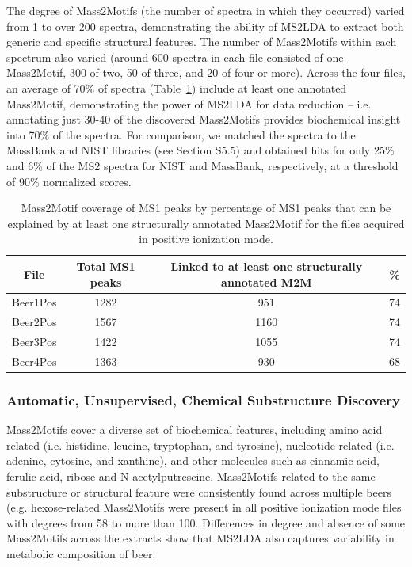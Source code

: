 The degree of Mass2Motifs (the number of spectra in which they occurred) varied from 1 to over 200 spectra, demonstrating the ability of MS2LDA to extract both generic and specific structural features. The number of Mass2Motifs within each spectrum also varied (around 600 spectra in each file consisted of one Mass2Motif, 300 of two, 50 of three, and 20 of four or more). Across the four files, an average of 70\% of spectra (Table~\ref{tab:ms2lda-coverage}) include at least one annotated Mass2Motif, demonstrating the power of MS2LDA for data reduction – i.e. annotating just 30-40 of the discovered Mass2Motifs provides biochemical insight into 70\% of the spectra. For comparison, we matched the spectra to the MassBank and NIST libraries (see Section S5.5) and obtained hits for only 25\% and 6\% of the MS2 spectra for NIST and MassBank, respectively, at a threshold of 90\% normalized scores. 

\begin{table}
\begin{centering}
\begin{tabular}{|c|c|c|c|}
\hline 
File & Total MS1 peaks & Linked to at least one structurally annotated M2M & \%\tabularnewline
\hline 
\hline 
Beer1Pos & 1282 & 951 & 74\tabularnewline
\hline 
Beer2Pos & 1567 & 1160 & 74\tabularnewline
\hline 
Beer3Pos & 1422 & 1055 & 74\tabularnewline
\hline 
Beer4Pos & 1363 & 930 & 68\tabularnewline
\hline 
\end{tabular}
\par\end{centering}
\caption{Mass2Motif coverage of MS1 peaks by percentage of MS1 peaks that can
be explained by at least one structurally annotated Mass2Motif for
the files acquired in positive ionization mode.\label{tab:ms2lda-coverage}}
\end{table}

\subsubsection{Automatic, Unsupervised, Chemical Substructure Discovery}

Mass2Motifs cover a diverse set of biochemical features, including amino acid related (i.e. histidine, leucine, tryptophan, and tyrosine), nucleotide related (i.e. adenine, cytosine, and xanthine), and other molecules such as cinnamic acid, ferulic acid, ribose and N-acetylputrescine. Mass2Motifs related to the same substructure or structural feature were consistently found across multiple beers (e.g. hexose-related Mass2Motifs were present in all positive ionization mode files with degrees from 58 to more than 100. Differences in degree and absence of some Mass2Motifs across the extracts show that MS2LDA also captures variability in metabolic composition of beer.

